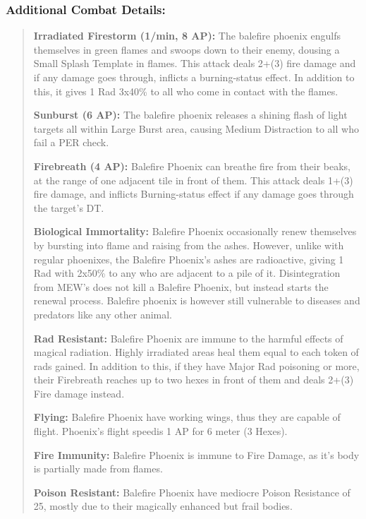\documentclass[11pt,a4paper,twocolumn]{book}
\begin{document}
	\subsubsection*{Additional Combat Details:}
	\begin{verse}
		\textbf{Irradiated Firestorm (1/min, 8 AP):} The balefire phoenix engulfs themselves in green flames and swoops down to their enemy, dousing a Small Splash Template in flames. This attack deals 2+(3) fire damage and if any damage goes through, inflicts a burning-status effect. In addition to this, it gives 1 Rad 3x40\% to all who come in contact with the flames.
		
		\textbf{Sunburst (6 AP):} The balefire phoenix releases a shining flash of light targets all within Large Burst area, causing Medium Distraction to all who fail a PER check.
		
		\textbf{Firebreath (4 AP):} Balefire Phoenix can breathe fire from their beaks, at the range of one adjacent tile in front of them. This attack deals 1+(3) fire damage, and inflicts Burning-status effect if any damage goes through the target's DT.
		
		\textbf{Biological Immortality:} Balefire Phoenix occasionally renew themselves by bursting into flame and raising from the ashes. However, unlike with regular phoenixes, the Balefire Phoenix's ashes are radioactive, giving 1 Rad with 2x50\% to any who are adjacent to a pile of it. Disintegration from MEW's does not kill a Balefire Phoenix, but instead starts the renewal process. Balefire phoenix is however still vulnerable to diseases and predators like any other animal.
		
		\textbf{Rad Resistant:} Balefire Phoenix are immune to the harmful effects of magical radiation. Highly irradiated areas heal them equal to each token of rads gained. In addition to this, if they have Major Rad poisoning or more, their Firebreath reaches up to two hexes in front of them and deals 2+(3) Fire damage instead.
		
		\textbf{Flying:} Balefire Phoenix have working wings, thus they are capable of flight. Phoenix's flight speedis 1 AP for 6 meter (3 Hexes).
		
		\textbf{Fire Immunity:} Balefire Phoenix is immune to Fire Damage, as it's body is partially made from flames.
		
		\textbf{Poison Resistant:} Balefire Phoenix have mediocre Poison Resistance of 25, mostly due to their magically enhanced but frail bodies.
	\end{verse}
	
\end{document}
